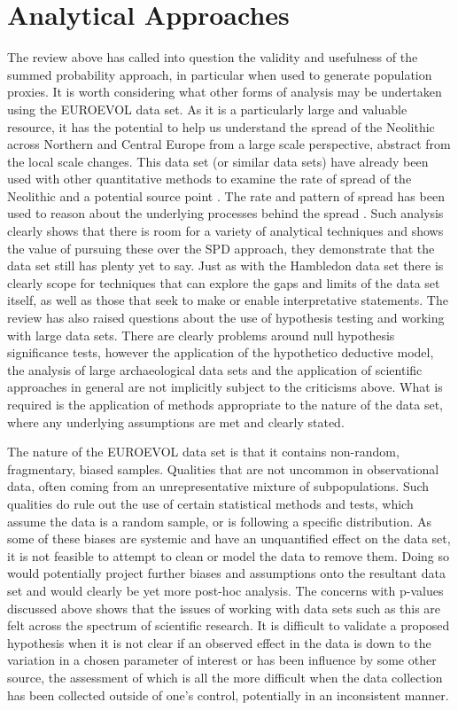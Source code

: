 \section{Analytical Approaches}
The review above has called into question the validity and usefulness of the summed probability approach, in particular when used to generate population proxies. It is worth considering what other forms of analysis may be undertaken using the EUROEVOL data set. As it is a particularly large and valuable resource, it has the potential to help us understand the spread of the Neolithic across Northern and Central Europe from a large scale perspective, abstract from the local scale changes. This data set (or similar data sets) have already been used with other quantitative methods to examine the rate of spread of the Neolithic and a potential source point \citep{Russell:2004fk}. The rate and pattern of spread has been used to reason about the underlying processes behind the spread \citep{gkiasta2003neolithic}. Such analysis clearly shows that there is room for a variety of analytical techniques and shows the value of pursuing these over the SPD approach, they demonstrate that the data set still has plenty yet to say. Just as with the Hambledon data set there is clearly scope for techniques that can explore the gaps and limits of the data set itself, as well as those that seek to make or enable interpretative statements. The review has also raised questions about the use of hypothesis testing and working with large data sets. There are clearly problems around null hypothesis significance tests, however the application of the hypothetico deductive model, the analysis of large archaeological data sets and the application of scientific approaches in general are not implicitly subject to the criticisms above. What is required is the application of methods appropriate to the nature of the data set, where any underlying assumptions are met and clearly stated. 

The nature of the EUROEVOL data set is that it contains non-random, fragmentary, biased samples. Qualities that are not uncommon in observational data, often coming from an unrepresentative mixture of subpopulations. Such qualities do rule out the use of certain statistical methods and tests, which assume the data is a random sample, or is following a specific distribution. As some of these biases are systemic and have an unquantified effect on the data set, it is not feasible to attempt to clean or model the data to remove them. Doing so would potentially project further biases and assumptions onto the resultant data set and would clearly be yet more post-hoc analysis. The concerns with p-values discussed above shows that the issues of working with data sets such as this are felt across the spectrum of scientific research. It is difficult to validate a proposed hypothesis when it is not clear if an observed effect in the data is down to the variation in a chosen parameter of interest or has been influence by some other source, the assessment of which is all the more difficult when the data collection has been collected outside of one's control, potentially in an inconsistent manner. 

